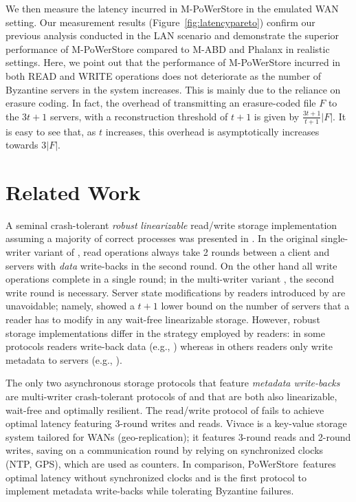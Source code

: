 \documentclass[10pt,conference,compsocconf]{IEEEtran}
\newcommand{\protocol}{PoWerStore}
\newcommand{\mprotocol}{M-PoWerStore}
\begin{document}
We then measure the latency incurred in \mprotocol{} in the emulated WAN setting. Our measurement results (Figure~\ref{fig:latencypareto}) confirm our previous analysis conducted in the LAN scenario and demonstrate the superior performance of \mprotocol{} compared to M-ABD and Phalanx in realistic settings. Here, we point out that the performance of \mprotocol{} incurred in both \textsc{READ} and \textsc{WRITE} operations does not deteriorate as the number of Byzantine servers in the system increases. This is mainly due to the reliance on erasure coding. In fact, the overhead of transmitting an erasure-coded file $F$ to the $3t+1$ servers, with a reconstruction threshold
of $t+1$ is given by $\frac{3t+1}{t+1}|F|$. It is easy to see that, as $t$ increases, this overhead is asymptotically increases towards $3|F|$.



\section{Related Work}\label{sec:relwork}

A seminal crash-tolerant \emph{robust} \emph{linearizable} read/write storage implementation assuming a majority of correct processes was presented in \cite{ABND95}. In the original single-writer variant of \cite{ABND95},  read operations always take 2 rounds between a client and servers with \emph{data} write-backs in the second round. On the other hand all write operations complete in a single round; in the multi-writer variant \cite{LS02}, the second write round is necessary. Server state modifications by readers introduced by \cite{ABND95} are unavoidable; namely, \cite{FL03} showed a $t+1$ lower bound on the number of servers that a reader has to modify in any wait-free linearizable storage. However, robust storage implementations differ in the strategy employed by readers: in some protocols readers write-back data (e.g., \cite{ABND95,Phalanx,AAB07,GNS09,GV10,DGM11}) whereas in others readers only write metadata to servers (e.g., \cite{FL03,DGLV10,CA12}).

The only two asynchronous storage protocols that feature \emph{metadata write-backs} are multi-writer crash-tolerant protocols of \cite{FL03} and \cite{CA12} that are both also linearizable, wait-free and optimally resilient. The read/write protocol of \cite{FL03} fails to achieve optimal latency featuring 3-round writes and reads. Vivace \cite{CA12} is a key-value storage system tailored for WANs (geo-replication); it features 3-round reads and 2-round writes, saving on a communication round by relying on synchronized clocks (NTP, GPS), which are used as counters. In comparison, \protocol\ features optimal latency without synchronized clocks and is the first protocol to implement metadata write-backs while tolerating Byzantine failures.
\end{document}
